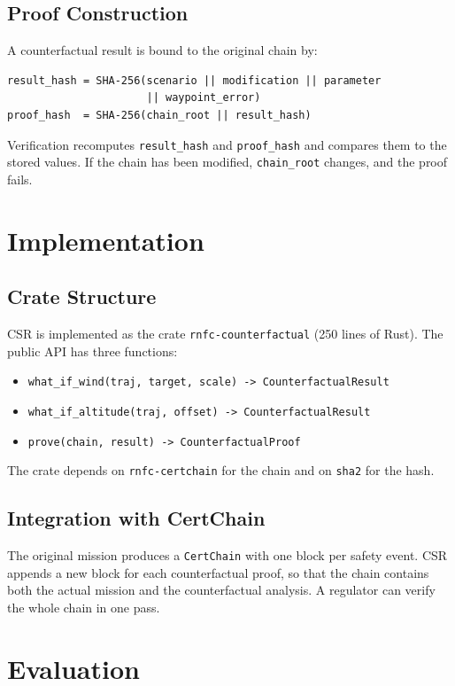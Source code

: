 \subsection{Proof Construction}
A counterfactual result is bound to the original chain by:
\begin{verbatim}
result_hash = SHA-256(scenario || modification || parameter
                      || waypoint_error)
proof_hash  = SHA-256(chain_root || result_hash)
\end{verbatim}
Verification recomputes \texttt{result\_hash} and \texttt{proof\_hash}
and compares them to the stored values. If the chain has been
modified, \texttt{chain\_root} changes, and the proof fails.

\section{Implementation}

\subsection{Crate Structure}
CSR is implemented as the crate \texttt{rnfc-counterfactual} (250
lines of Rust). The public API has three functions:
\begin{itemize}
    \item \texttt{what\_if\_wind(traj, target, scale) -> CounterfactualResult}
    \item \texttt{what\_if\_altitude(traj, offset) -> CounterfactualResult}
    \item \texttt{prove(chain, result) -> CounterfactualProof}
\end{itemize}
The crate depends on \texttt{rnfc-certchain} for the chain and on
\texttt{sha2} for the hash.

\subsection{Integration with CertChain}
The original mission produces a \texttt{CertChain} with one block per
safety event. CSR appends a new block for each counterfactual proof,
so that the chain contains both the actual mission and the
counterfactual analysis. A regulator can verify the whole chain in
one pass.

\section{Evaluation}

